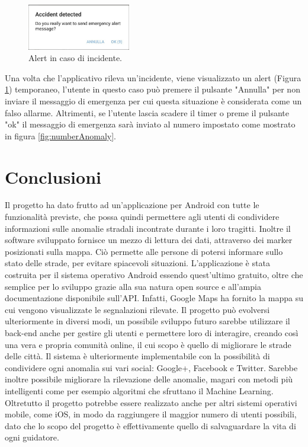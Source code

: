 \documentclass[a4paper, 11pt]{article} %
\begin{document}
\begin{figure} %
	\begin{center}
		\includegraphics[width=0.4\textwidth]{images/alert.jpg}
	\end{center}
	\caption{Alert in caso di incidente.}
	\label{fig:accidentDetected}
\end{figure}
Una volta che l'applicativo rileva un'incidente, viene visualizzato un alert (Figura \ref{fig:accidentDetected}) temporaneo, l'utente in questo caso può premere il pulsante "Annulla" per non inviare il messaggio di emergenza per cui questa situazione è considerata come un falso allarme. Altrimenti, se l'utente lascia scadere il timer o preme il pulsante "ok" il messaggio di emergenza sarà inviato al numero impostato come mostrato in figura \ref{fig:numberAnomaly}. 

\newpage
\section{Conclusioni}
Il progetto ha dato frutto ad un'applicazione per Android con tutte le funzionalità previste, che possa quindi permettere agli utenti di condividere informazioni sulle anomalie stradali incontrate durante i loro tragitti. Inoltre il software sviluppato fornisce un mezzo di lettura dei dati, attraverso dei marker posizionati sulla mappa. Ciò permette alle persone di potersi informare sullo stato delle strade, per evitare spiacevoli situazioni. L'applicazione è stata costruita per il sistema operativo Android essendo quest'ultimo gratuito, oltre che semplice per lo sviluppo grazie alla sua natura open source e all'ampia documentazione disponibile sull'API. Infatti, Google Maps ha fornito la mappa su cui vengono visualizzate le segnalazioni rilevate. Il progetto può evolversi ulteriormente in diversi modi, un possibile sviluppo futuro sarebbe utilizzare il back-end anche per gestire gli utenti e permettere loro di interagire, creando così una vera e propria comunità online, il cui scopo è quello di migliorare le strade delle città.  Il sistema è ulteriormente implementabile con la possibilità di condividere ogni anomalia sui vari social: Google+, Facebook e Twitter. Sarebbe inoltre possibile migliorare la rilevazione delle anomalie, magari con metodi più intelligenti come per esempio algoritmi che sfruttano il Machine Learning. Oltretutto il progetto potrebbe essere realizzato anche per altri sistemi operativi mobile, come iOS, in modo da raggiungere il maggior numero di utenti possibili, dato che lo scopo del progetto è effettivamente quello di salvaguardare la vita di ogni guidatore.
\newpage




\end{document}
